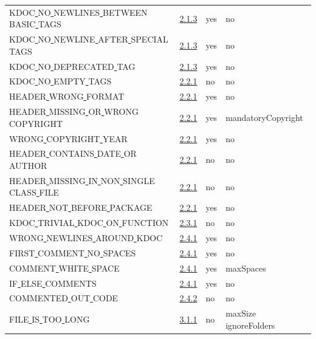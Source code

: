 \begin{longtable}{ |l|p{0.8cm}|p{0.8cm}| p{3cm} | }
KDOC\underline{ }NO\underline{ }NEWLINES\underline{ }BETWEEN\underline{ }BASIC\underline{ }TAGS & \hyperref[sec:2.1.3]{ 2.1.3} &  yes  &   no  \\
KDOC\underline{ }NO\underline{ }NEWLINE\underline{ }AFTER\underline{ }SPECIAL\underline{ }TAGS & \hyperref[sec:2.1.3]{ 2.1.3} &  yes  &   no  \\
KDOC\underline{ }NO\underline{ }DEPRECATED\underline{ }TAG & \hyperref[sec:2.1.3]{ 2.1.3} &  yes  &   no  \\
KDOC\underline{ }NO\underline{ }EMPTY\underline{ }TAGS & \hyperref[sec:2.2.1]{ 2.2.1} &  no  &   no  \\
HEADER\underline{ }WRONG\underline{ }FORMAT & \hyperref[sec:2.2.1]{ 2.2.1} &  yes  &   no  \\
HEADER\underline{ }MISSING\underline{ }OR\underline{ }WRONG\underline{ }COPYRIGHT & \hyperref[sec:2.2.1]{ 2.2.1} &  yes  &  mandatoryCopyright \\
WRONG\underline{ }COPYRIGHT\underline{ }YEAR & \hyperref[sec:2.2.1]{ 2.2.1} &  yes  &   no  \\
HEADER\underline{ }CONTAINS\underline{ }DATE\underline{ }OR\underline{ }AUTHOR & \hyperref[sec:2.2.1]{ 2.2.1} &  no  &   no  \\
HEADER\underline{ }MISSING\underline{ }IN\underline{ }NON\underline{ }SINGLE\underline{ }CLASS\underline{ }FILE & \hyperref[sec:2.2.1]{ 2.2.1} &  no  &   no  \\
HEADER\underline{ }NOT\underline{ }BEFORE\underline{ }PACKAGE & \hyperref[sec:2.2.1]{ 2.2.1} &  yes  &   no  \\
KDOC\underline{ }TRIVIAL\underline{ }KDOC\underline{ }ON\underline{ }FUNCTION & \hyperref[sec:2.3.1]{ 2.3.1} &  no  &   no  \\
WRONG\underline{ }NEWLINES\underline{ }AROUND\underline{ }KDOC & \hyperref[sec:2.4.1]{ 2.4.1} &  yes  &   no  \\
FIRST\underline{ }COMMENT\underline{ }NO\underline{ }SPACES & \hyperref[sec:2.4.1]{ 2.4.1} &  yes  &   no  \\
COMMENT\underline{ }WHITE\underline{ }SPACE & \hyperref[sec:2.4.1]{ 2.4.1} &  yes  &   maxSpaces  \\
IF\underline{ }ELSE\underline{ }COMMENTS & \hyperref[sec:2.4.1]{ 2.4.1} &  yes  &   no  \\
COMMENTED\underline{ }OUT\underline{ }CODE & \hyperref[sec:2.4.2]{ 2.4.2} &  no  &   no  \\
FILE\underline{ }IS\underline{ }TOO\underline{ }LONG & \hyperref[sec:3.1.1]{ 3.1.1} &  no  &   maxSize  ignoreFolders  \\

\end{longtable}
